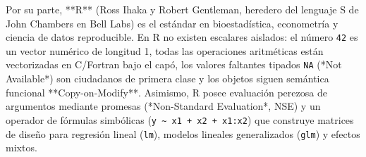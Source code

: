 \documentclass{book}
\begin{document}
Por su parte, **R** (Ross Ihaka y Robert Gentleman, heredero del lenguaje S de John Chambers en Bell Labs) es el estándar en bioestadística, econometría y ciencia de datos reproducible. En R no existen escalares aislados: el número \texttt{42} es un vector numérico de longitud 1, todas las operaciones aritméticas están vectorizadas en C/Fortran bajo el capó, los valores faltantes tipados \texttt{NA} (*Not Available*) son ciudadanos de primera clase y los objetos siguen semántica funcional **Copy-on-Modify**. Asimismo, R posee evaluación perezosa de argumentos mediante promesas (*Non-Standard Evaluation*, NSE) y un operador de fórmulas simbólicas (\texttt{y \textasciitilde{} x1 + x2 + x1:x2}) que construye matrices de diseño para regresión lineal (\texttt{lm}), modelos lineales generalizados (\texttt{glm}) y efectos mixtos.
\end{document}
